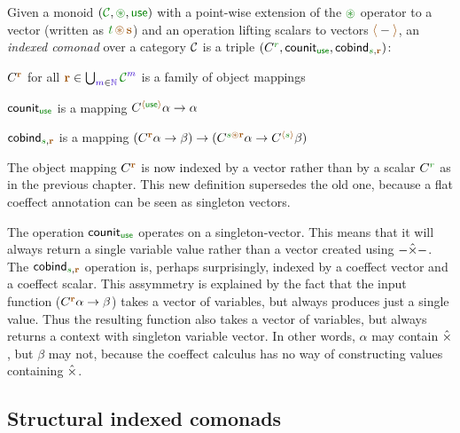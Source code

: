 \begin{definition}
Given a monoid $(\C, \cseq, \cunit)$ with a point-wise extension of the $\cseq$ operator to a vector 
(written as $\cclrd{t}\,\aseq\,\aclrd{\textbf{s}}$) and an operation lifting scalars to vectors 
$\alift{-}$, an \emph{indexed comonad} over a category $\mathcal{C}$ is a triple 
$(\ctyp{\cclrd{r}{}}, \ident{counit}_{\cunit}, \ident{cobind}_{\cclrd{s}, \aclrd{\textbf{r}}})$:

\begin{compactitem}
\item $\ctyp{\aclrd{\textbf{r}}}{}$ for all $\aclrd{\textbf{r}} \in \bigcup_{\sclrd{m}\in \sclrd{\mathbb{N}}} \C^{\sclrd{m}}$ is a family of object mappings 
\item $\ident{counit}_{\cunit}$ is a mapping $\ctyp{\alift{\cunit}}{\alpha} \rightarrow \alpha$ 
\item $\ident{cobind}_{\cclrd{s}, \aclrd{\textbf{r}}}$ is a mapping $(\ctyp{\aclrd{\textbf{r}}}{\alpha} \rightarrow \beta) 
  \rightarrow (\ctyp{\cclrd{s}\aseq\aclrd{\textbf{r}}}{\alpha} \rightarrow \ctyp{\alift{\cclrd{s}}}{\beta})$
\end{compactitem}
\end{definition}

\noindent
The object mapping $\ctyp{\aclrd{\textbf{r}}}$ is now indexed by a vector rather than by a scalar 
$\ctyp{\cclrd{r}}$ as in the previous chapter. This new definition supersedes the old one, because a 
flat coeffect annotation can be seen as singleton vectors.

The operation $\ident{counit}_{\cunit}$ operates on a singleton-vector. This means that it will always
return a single variable value rather than a vector created using $-\hat{\times}-$. The $\ident{cobind}_{\cclrd{s}, \aclrd{\textbf{r}}}$
operation is, perhaps surprisingly, indexed by a coeffect vector and a coeffect scalar. This assymmetry
is explained by the fact that the input function ($\ctyp{\aclrd{\textbf{r}}}{\alpha} \rightarrow \beta$)
takes a vector of variables, but always produces just a single value. Thus the resulting function 
also takes a vector of variables, but always returns a context with singleton variable vector.
In other words, $\alpha$ may contain $\hat{\times}$, but $\beta$ may not, because the coeffect calculus has
no way of constructing values containing $\hat{\times}$.


\subsection{Structural indexed comonads}

